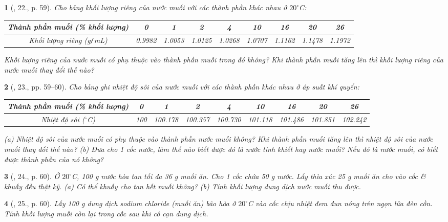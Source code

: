 \documentclass{article}
\newtheorem{baitoan}{}
\begin{document}
\begin{baitoan}[\cite{ncpt_KHTN_6_tap_1}, 22., p. 59]
	Cho bảng khối lượng riêng của nước muối với các thành phần khác nhau ở $20^\circ${\rm C}:
	\begin{table}[H]
		\centering
		\begin{tabular}{|c|c|c|c|c|c|c|c|c|}
			\hline
			Thành phần muối (\% khối lượng) & 0 & 1 & 2 & 4 & 10 & 16 & 20 & 26 \\
			\hline
			Khối lượng riêng (g{\tt/}mL) & 0.9982 & 1.0053 & 1.0125 & 1.0268 & 1.0707 & 1.1162 & 1.1478 & 1.1972 \\
			\hline
		\end{tabular}
	\end{table}
	\noindent Khối lượng riêng của nước muối có phụ thuộc vào thành phần muối trong đó không? Khi thành phần muối tăng lên thì khối lượng riêng của nước muối thay đổi thế nào?
\end{baitoan}

\begin{baitoan}[\cite{ncpt_KHTN_6_tap_1}, 23., pp. 59--60]
	Cho bảng ghi nhiệt độ sôi của nước muối với các thành phần khác nhau ở áp suất khí quyển:
	\begin{table}[H]
		\centering
		\begin{tabular}{|c|c|c|c|c|c|c|c|c|}
			\hline
			Thành phần muối (\% khối lượng) & 0 & 1 & 2 & 4 & 10 & 16 & 20 & 26 \\
			\hline
			Nhiệt độ sôi (${}^\circ$C) & 100 & 100.178 & 100.357 & 100.730 & 101.118 & 101.486 & 101.851 & 102.242 \\
			\hline
		\end{tabular}
	\end{table}
	\noindent(a) Nhiệt độ sôi của nước muối có phụ thuộc vào thành phần nước muối không? Khi thành phần muối tăng lên thì nhiệt độ sôi của nước muối thay đổi thế nào? (b) Đưa cho 1 cốc nước, làm thế nào biết được đó là nước tinh khiết hay nước muối? Nếu đó là nước muối, có biết được thành phần của nó không?
\end{baitoan}

\begin{baitoan}[\cite{ncpt_KHTN_6_tap_1}, 24., p. 60]
	Ở $20^\circ${\rm C, 100 g} nước hòa tan tối đa {\rm36 g} muối ăn. Cho 1 cốc chứa {\rm50 g} nước. Lấy thìa xúc {\rm25 g} muối ăn cho vào cốc \& khuấy đều thật kỹ. (a) Có thể khuấy cho tan hết muối không? (b) Tính khối lượng dung dịch nước muối thu được.
\end{baitoan}

\begin{baitoan}[\cite{ncpt_KHTN_6_tap_1}, 25., p. 60]
	Lấy {\rm100 g} dung dịch sodium chloride (muối ăn) bão hòa ở $20^\circ${\rm C} vào cốc chịu nhiệt đem đun nóng trên ngọn lửa đèn cồn. Tính khối lượng muối còn lại trong cốc sau khi cô cạn dung dịch.
\end{baitoan}
\end{document}

